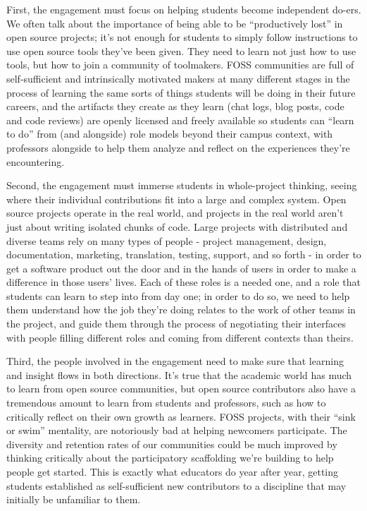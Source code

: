 \documentclass{sig-alternate}
\begin{document}
First, the engagement must focus on helping students become independent do-ers. We often talk about the importance of being able to be ``productively lost'' in open source projects; it's not enough for students to simply follow instructions to use open source tools they've been given. They need to learn not just how to use tools, but how to join a community of toolmakers. FOSS communities are full of self-sufficient and intrinsically motivated makers at many different stages in the process of learning the same sorts of things students will be doing in their future careers, and the artifacts they create as they learn (chat logs, blog posts, code and code reviews) are openly licensed and freely available so students can ``learn to do'' from (and alongside) role models beyond their campus context, with professors alongside to help them analyze and reflect on the experiences they're encountering.

Second, the engagement must immerse students in whole-project thinking, seeing where their individual contributions fit into a large and complex system. Open source projects operate in the real world, and projects in the real world aren't just about writing isolated chunks of code. Large projects with distributed and diverse teams rely on many types of people - project management, design, documentation, marketing, translation, testing, support, and so forth - in order to get a software product out the door and in the hands of users in order to make a difference in those users' lives. Each of these roles is a needed one, and a role that students can learn to step into from day one; in order to do so, we need to help them understand how the job they're doing relates to the work of other teams in the project, and guide them through the process of negotiating their interfaces with people filling different roles and coming from different contexts than theirs.

Third, the people involved in the engagement need to make sure that learning and insight flows in both directions. It's true that the academic world has much to learn from open source communities, but open source contributors also have a tremendous amount to learn from students and professors, such as how to critically reflect on their own growth as learners. FOSS projects, with their ``sink or swim'' mentality, are notoriously bad at helping newcomers participate. The diversity and retention rates of our communities could be much improved by thinking critically about the participatory scaffolding we're building to help people get started.  This is exactly what educators do year after year, getting students established as self-sufficient new contributors to a discipline that may initially be unfamiliar to them.
\end{document}
